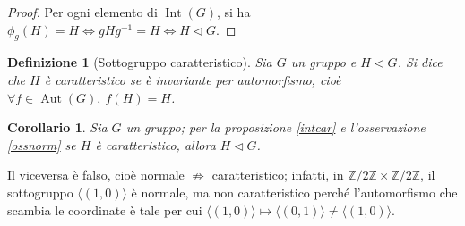 \documentclass[11pt]{article}
\theoremstyle{style}
\newtheorem{definizione}{Definizione}[section]
\newtheorem{corollario}{Corollario}[teorema]
\numberwithin{equation}{subsection}
\begin{document}
	\begin{proof}
Per ogni elemento di $\operatorname{Int} (G)$, si ha $\phi _g (H) = H \iff gH g^{-1} = H \iff H \lhd G$.
	\end{proof}
\begin{definizione}
	[Sottogruppo caratteristico]
	Sia $G$ un gruppo e $H < G$. Si dice che $H$ \`e \textit{caratteristico} se \`e invariante per automorfismo, cio\`e $\forall f \in \operatorname{Aut} (G), \ f(H) = H$.
\end{definizione}
\begin{corollario}
	Sia $G$ un gruppo; per la proposizione \ref{intcar} e l'osservazione \ref{ossnorm} se $H$ \`e caratteristico, allora $H \lhd G$.
\end{corollario}
\noindent Il viceversa \`e falso, cio\`e normale $\not\Rightarrow $ caratteristico; infatti, in $\mathbb{Z} / 2\mathbb{Z} \times  \mathbb{Z} / 2\mathbb{Z}$, il sottogruppo $\langle (1,0) \rangle$ \`e normale, ma non caratteristico perch\'e l'automorfismo che scambia le coordinate \`e tale per cui $\langle (1,0) \rangle\mapsto \langle (0,1) \rangle\neq \langle (1,0) \rangle$.
\end{document}
